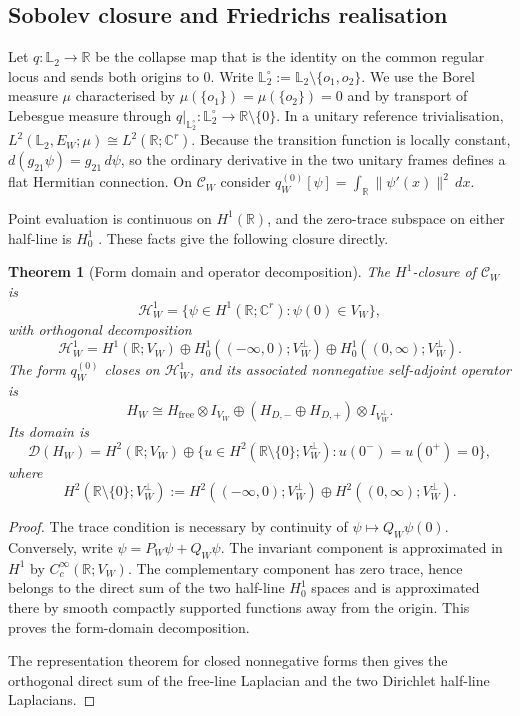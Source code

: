 \documentclass[11pt]{article}
\theoremstyle{plain}
\newtheorem{theorem}{Theorem}[section]
\theoremstyle{definition}
\newcommand{\R}{\mathbb{R}}
\newcommand{\C}{\mathbb{C}}
\newcommand{\Ltwo}{\mathbb{L}_{2}}
\begin{document}
\subsection{Sobolev closure and Friedrichs realisation}

Let \(q:\Ltwo\longrightarrow\R\) be the collapse map that is the identity on the common regular locus and sends both origins to \(0\). Write
\(\Ltwo^\circ:=\Ltwo\setminus\{o_1,o_2\}\).
We use the Borel measure \(\mu\) characterised by \(\mu(\{o_1\})=\mu(\{o_2\})=0\) and by transport of Lebesgue measure through
\(q|_{\Ltwo^\circ}:\Ltwo^\circ\longrightarrow\R\setminus\{0\}\).
In a unitary reference trivialisation,
\(L^2(\Ltwo,E_W;\mu)\cong L^2(\R;\C^r)\).
Because the transition function is locally constant,
\(d(g_{21}\psi)=g_{21}\,d\psi\),
so the ordinary derivative in the two unitary frames defines a flat Hermitian connection. On \(\mathcal C_W\) consider
\(q_W^{(0)}[\psi] = \int_\R\|\psi'(x)\|^2\,dx\).

Point evaluation is continuous on \(H^1(\R)\), and the zero-trace subspace on either half-line is \(H_0^1\)
\citep{AdamsFournier2003}. These facts give the following closure directly.

\begin{theorem}[Form domain and operator decomposition]
\label{thm:unitary-L2-Friedrichs}
The \(H^1\)-closure of \(\mathcal C_W\) is
\[
\mathcal H_W^1
=
\{\psi\in H^1(\R;\C^r):\psi(0)\in V_W\},
\]
with orthogonal decomposition
\[
\mathcal H_W^1
=
H^1(\R;V_W)
\oplus
H_0^1((-\infty,0);V_W^\perp)
\oplus
H_0^1((0,\infty);V_W^\perp).
\]
The form \(q_W^{(0)}\) closes on \(\mathcal H_W^1\), and its associated nonnegative self-adjoint operator is
\[
H_W
\cong
H_{\mathrm{free}}\otimes I_{V_W}
\oplus
(H_{D,-}\oplus H_{D,+})\otimes I_{V_W^\perp}.
\]
Its domain is
\[
\mathcal D(H_W)
=
H^2(\R;V_W)
\oplus
\{u\in H^2(\R\setminus\{0\};V_W^\perp):
u(0^-)=u(0^+)=0\},
\]
where
\[
H^2(\R\setminus\{0\};V_W^\perp)
:=
H^2((-\infty,0);V_W^\perp)
\oplus
H^2((0,\infty);V_W^\perp).
\]
\end{theorem}

\begin{proof}
The trace condition is necessary by continuity of
\(\psi\mapsto Q_W\psi(0)\). Conversely, write
\(\psi=P_W\psi+Q_W\psi\). The invariant component is approximated in \(H^1\) by \(C_c^\infty(\R;V_W)\). The complementary component has zero trace, hence belongs to the direct sum of the two half-line \(H_0^1\) spaces and is approximated there by smooth compactly supported functions away from the origin. This proves the form-domain decomposition.

The representation theorem for closed nonnegative forms
\citep{Kato1995,Schmudgen2012}
then gives the orthogonal direct sum of the free-line Laplacian and the two Dirichlet half-line Laplacians.
\end{proof}
\end{document}

